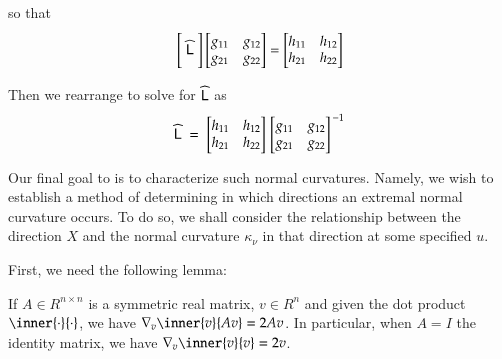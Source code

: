 		so that
		\begin{equation}
		\Bigg[ \;\widehat{\mathsf{L}}\; \Bigg]
		\begin{bmatrix} g_{11} & g_{12} \\ g_{21} & g_{22} \end{bmatrix}
		= \begin{bmatrix} h_{11} & h_{12} \\ h_{21} & h_{22} \end{bmatrix}
		\end{equation}
		
		Then we rearrange to solve for $\widehat{\mathsf{L}}$ as
			\begin{equation} \label{weinmatconstruction}
			\widehat{\mathsf{L}}
			\;=\; \begin{bmatrix} h_{11} & h_{12} \\ h_{21} & h_{22} \end{bmatrix}
			\left.\begin{bmatrix} g_{11} & g_{12} \\ g_{21} & g_{22} \end{bmatrix}\right.^{-1}
			\end{equation}
		
		Our final goal to is to characterize such normal curvatures.
		Namely, we wish to establish a method of determining in which directions an extremal
		normal curvature occurs.
		To do so, we shall consider the relationship between the direction $X$ and the normal curvature $\kappa_\nu$ in that direction at some specified $u$.

	
		
		First, we need the following lemma:
        \begin{lemma}
            If $A\in R^{n\times n}$ is a symmetric real matrix, $v \in R^n$
            and given the dot product $\inner{\cdot}{\cdot}$,
            we have $\nabla_{v} \inner{v}{Av} = 2Av$.
            In particular, when $A = I$ the identity matrix, we have
            $ \nabla_{v} \inner{v}{v} = 2v$.
        \end{lemma}
        
